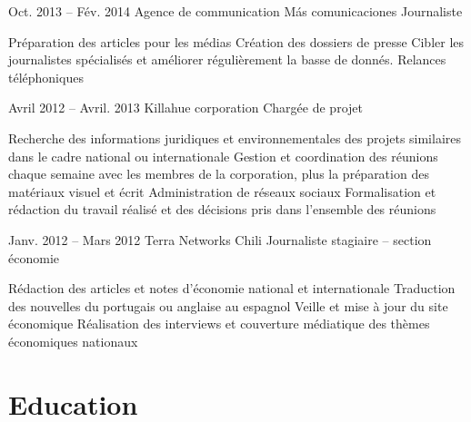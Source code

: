 \documentclass{tccv}
\begin{document}
\begin{eventlist}
\item{Oct. 2013 -- Fév. 2014 }     
  {Agence de communication Más comunicaciones}     
  {Journaliste}

\begin{itemize}
  \cvitem[\checkmark] Préparation des articles pour les médias
  \cvitem[\checkmark] Création des dossiers de presse 
  \cvitem[\checkmark] Cibler les journalistes spécialisés et améliorer régulièrement la basse de donnés. 
  \cvitem[\checkmark] Relances téléphoniques
\end{itemize}       



\item{Avril 2012 -- Avril. 2013 }     
  {Killahue corporation}     
  {Chargée de projet}

\begin{itemize}
  \cvitem[\checkmark] Recherche des informations juridiques et environnementales des projets similaires dans le cadre national ou internationale
  \cvitem[\checkmark] Gestion et coordination des réunions chaque semaine avec les membres de la corporation, plus la préparation des matériaux visuel et écrit
  \cvitem[\checkmark] Administration de réseaux sociaux 
  \cvitem[\checkmark] Formalisation et rédaction du travail réalisé et des décisions pris dans l’ensemble des réunions

\end{itemize}      
    

\item{Janv. 2012 -- Mars 2012 }     
  {Terra Networks Chili}     
  {Journaliste stagiaire – section économie}

\begin{itemize}
  \cvitem[\checkmark] Rédaction des articles et notes d’économie national et internationale
  \cvitem[\checkmark] Traduction des nouvelles du portugais ou anglaise au espagnol
  \cvitem[\checkmark] Veille et mise à jour du site économique
  \cvitem[\checkmark] Réalisation des interviews et couverture médiatique des thèmes économiques nationaux

\end{itemize}        
   
   


\end{eventlist}



\section{Education}
\end{document}
